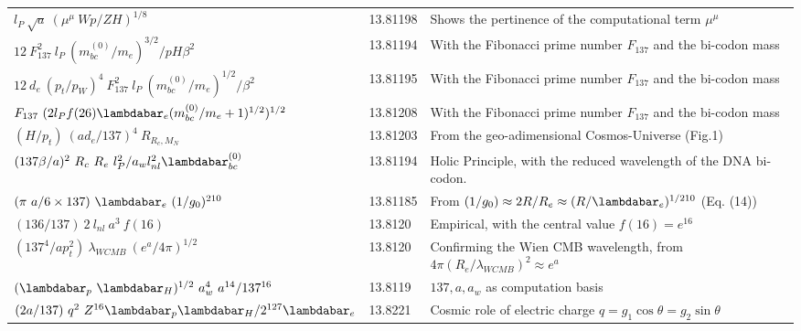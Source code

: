 \documentclass[a4paper,9pt]{article}
\begin{document}
\begin{table}
\begin{tabular}{lll}
 
 $ l_{P} ~\sqrt a ~(\mu^{\mu}~Wp/ZH)^{1/8}$  & 13.81198 & Shows the pertinence of the computational term $\mu^{\mu}$   \\
 
 
  $12~ F_{137}^2 ~l_P~(m_{bc}^{(0)}/m_e)^{3/2}/pH\beta^2$ & 13.81194    & With the Fibonacci prime number $F_{137}$ and the bi-codon mass\\
  
  $12 ~d_e ~(p_t/p_W)^4~ F_{137}^2 ~l_P~(m_{bc}^{(0)}/m_e)^{1/2}/\beta^2$ & 13.81195    & With the Fibonacci prime number $F_{137}$ and the bi-codon mass\\
  
  $F_{137} ~(2 l_P f(26) \lambdabar_{e}(m_{bc}^{(0)}/m_e+1)^{1/2})^{1/2}$ & 13.81208    & With the Fibonacci prime number $F_{137}$ and the bi-codon mass\\
 
 
 
  $(H/p_t)~(ad_e/137)^4 ~R_{R_c,M_N} $ & 13.81203    & From the geo-adimensional Cosmos-Universe (Fig.1)\\
  
  
 
 $(137\beta/a)^2~R_c~R_e~l_P^2/a_w l_{nl}^2\lambdabar_{bc}^{(0)}$ & 13.81194    &  Holic Principle, with the reduced wavelength of the DNA bi-codon. \\
  
 
 
$(\pi ~a/6\times 137) ~\lambdabar_e ~(1/g_0)^{210} $ & 13.81185 & From $(1/g_0) \approx 2R/R_e \approx (R/\lambdabar_e)^{1/210}$ (Eq. (14)) \\  
     
  
 $ (136/137)~2~l_{nl}~a^3~f(16)$  & 13.8120    & Empirical, with the central value $f(16) = e^{16}$ \\ 
 
  $ (137^4/ap_t^2)~\lambda_{WCMB}~(e^a/4\pi)^{1/2}$  & 13.8120    & Confirming the Wien CMB wavelength, from $4\pi (R_e/\lambda_{WCMB})^2 \approx e^{a}$ \\ 
 
 
  
  
 $(\lambdabar_{p}~ \lambdabar_{H})^{1/2} ~a_w^4~ a^{14}/137^{16}$  & 13.8119    &  $137,a,a_w$ as computation basis \\
 
 
 
 
  $(2a/137)~q^2 ~Z^{16} \lambdabar_{p} \lambdabar_{H}/2^{127}\lambdabar_{e} $  & 13.8221    & Cosmic role of electric charge $q = g_1 \cos \theta = g_2 \sin \theta$  \\
 

\end{tabular}
\end{table}
\end{document}
